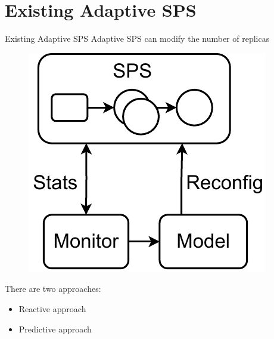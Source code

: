 \section[2]{Existing Adaptive SPS}
\begin{frame}{Existing Adaptive SPS}
	Adaptive SPS can modify the number of replicas
	
	\begin{figure}
		\includegraphics[scale=0.5]{images/concepts/RW-Automatic.pdf}
	\end{figure}
	
	There are two approaches:
	\begin{itemize}
		\item Reactive approach
		\item Predictive approach
	\end{itemize}
\end{frame}

